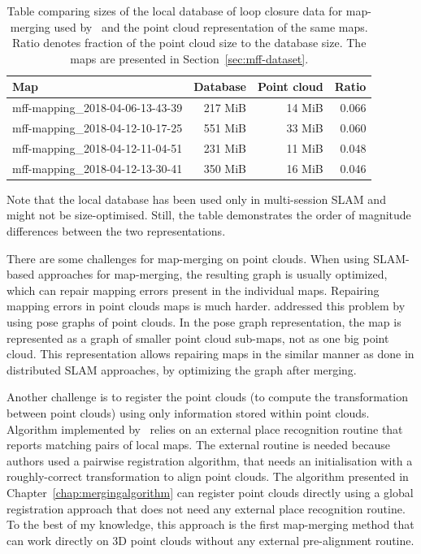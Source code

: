\begin{table}[b!]

	\centering
	\begin{tabular}{lrr D{.}{.}{3}}
	\toprule
	\textbf{Map} & \textbf{Database} & \textbf{Point cloud} & \textbf{Ratio} \\
	\midrule
	mff-mapping\_2018-04-06-13-43-39 & 217 MiB & 14 MiB & 0.066 \\
	mff-mapping\_2018-04-12-10-17-25 & 551 MiB & 33 MiB & 0.060 \\
	mff-mapping\_2018-04-12-11-04-51 & 231 MiB & 11 MiB & 0.048 \\
	mff-mapping\_2018-04-12-13-30-41 & 350 MiB & 16 MiB & 0.046 \\
	\bottomrule
	\end{tabular}
	\caption{Table comparing sizes of the local database of loop closure data for map-merging used by~\citet{labbe2014online} and the point cloud representation of the same maps. Ratio denotes fraction of the point cloud size to the database size. The maps are presented in Section~\ref{sec:mff-dataset}.}
	\label{tabl:rtabmap-db-vs-point-clouds}
\end{table}

Note that the local database has been used only in multi-session \gls{SLAM} and might not be size-optimised. Still, the table demonstrates the order of magnitude differences between the two representations.

There are some challenges for map-merging on point clouds. When using \gls{SLAM}-based approaches for map-merging, the resulting graph is usually optimized, which can repair mapping errors present in the individual maps. Repairing mapping errors in point clouds maps is much harder. \citet{bonanni2017pose} addressed this problem by using pose graphs of point clouds. In the pose graph representation, the map is represented as a graph of smaller point cloud sub-maps, not as one big point cloud. This representation allows repairing maps in the similar manner as done in distributed \gls{SLAM} approaches, by optimizing the graph after merging.

Another challenge is to register the point clouds (to compute the transformation between point clouds) using only information stored within point clouds. Algorithm implemented by~\citet{bonanni2017pose} relies on an external place recognition routine that reports matching pairs of local maps. The external routine is needed because authors used a pairwise registration algorithm, that needs an initialisation with a roughly-correct transformation to align point clouds. The algorithm presented in Chapter~\ref{chap:mergingalgorithm} can register point clouds directly using a global registration approach that does not need any external place recognition routine. To the best of my knowledge, this approach is the first map-merging method
that can work directly on \gls{3D} point clouds without any external pre-alignment routine.

